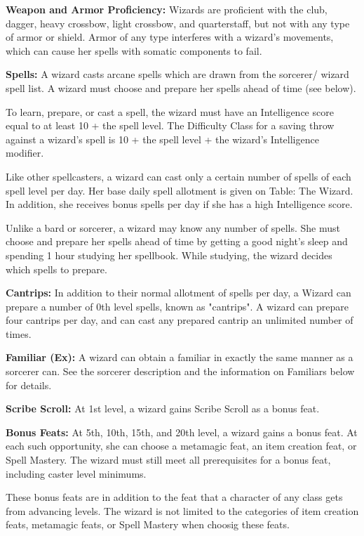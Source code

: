 \classfeatures

\textbf{Weapon and Armor Proficiency:} Wizards are proficient with the club, dagger, heavy crossbow, light crossbow, and quarterstaff, but not with any type of armor or shield. Armor of any type interferes with a wizard's movements, which can cause her spells with somatic components to fail.

\textbf{Spells:} A wizard casts arcane spells which are drawn from the sorcerer/ wizard spell list. A wizard must choose and prepare her spells ahead of time (see below).

To learn, prepare, or cast a spell, the wizard must have an Intelligence score equal to at least 10 + the spell level. The Difficulty Class for a saving throw against a wizard's spell is 10 + the spell level + the wizard's Intelligence modifier.

Like other spellcasters, a wizard can cast only a certain number of spells of each spell level per day. Her base daily spell allotment is given on Table: The Wizard. In addition, she receives bonus spells per day if she has a high Intelligence score.

Unlike a bard or sorcerer, a wizard may know any number of spells. She must choose and prepare her spells ahead of time by getting a good night's sleep and spending 1 hour studying her spellbook. While studying, the wizard decides which spells to prepare.

\textbf{Cantrips:} In addition to their normal allotment of spells per day, a Wizard can prepare a number of 0th level spells, known as "cantrips". A wizard can prepare four cantrips per day, and can cast any prepared cantrip an unlimited number of times.

\textbf{Familiar (Ex):} A wizard can obtain a familiar in exactly the same manner as a sorcerer can. See the sorcerer description and the information on Familiars below for details.

\textbf{Scribe Scroll:} At 1st level, a wizard gains Scribe Scroll as a bonus feat.

\textbf{Bonus Feats:} At 5th, 10th, 15th, and 20th level, a wizard gains a bonus feat. At each such opportunity, she can choose a metamagic feat, an item creation feat, or Spell Mastery. The wizard must still meet all prerequisites for a bonus feat, including caster level minimums.

These bonus feats are in addition to the feat that a character of any class gets from advancing levels. The wizard is not limited to the categories of item creation feats, metamagic feats, or Spell Mastery when choosig these feats.

